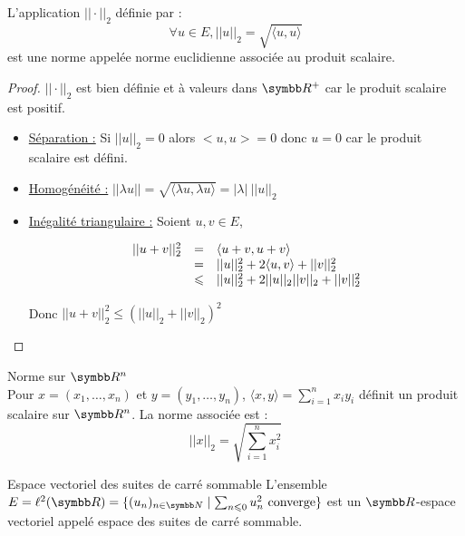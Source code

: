 \begin{theoreme}{}{}
    L'application $|| \cdot ||_2$ définie par : 
    \[\forall u \in E, ||u||_2 = \sqrt{\langle u, u \rangle}\]
    est une norme appelée norme euclidienne associée au produit scalaire. 
\end{theoreme}


\begin{proof}
    $|| \cdot ||_2$ est bien définie et à valeurs dans $\R^+$ car le produit scalaire est positif. 

    \begin{itemize}
        \item \uline{Séparation :} Si $||u||_2 = 0 $ alors $<u, u> = 0$ donc $u = 0$ car le produit scalaire est défini. 

        \item \uline{Homogénéité :} $||\lambda u|| = \sqrt{\langle \lambda u, \lambda u\rangle} = |\lambda| ~ ||u||_2$

        \item \uline{Inégalité triangulaire :} Soient $u, v \in E$,

        \[
            \begin{array}{rcl}
                ||u + v ||^2_2 & = & \langle u + v , u + v \rangle \\
                \space & = & ||u||_2^2 + 2 \langle u, v \rangle + ||v||_2^2 \\
                \space & \leqslant & ||u||_2^2 + 2 ||u||_2||v||_2 + ||v||_2^2 \\
            \end{array}
        \]

        Donc $||u + v||_2^2 \leqslant (||u||_2 + ||v||_2)^2$
    \end{itemize}
\end{proof}

\begin{definition}{Norme sur $\R^n$}{}
    \\Pour $x = (x_1, \dots, x_n)$ et $y = (y_1, \dots, y_n)$, $\displaystyle \langle x, y \rangle = \sum_{i = 1 }^{n }x_i y_i$ définit un 
    produit scalaire sur $\R^n$. La norme associée est :
    \[||x||_2 = \sqrt{\sum_{i = 1 }^{n }x_i^2}\]
\end{definition}

\begin{theoreme}{Espace vectoriel des suites de carré sommable}{}
    L'ensemble $E = \ell^2(\R) = \{(u_n)_{n \in \N} \mid \sum_{n \leqslant 0 }u_n^2 \text{ converge}\}$
    est un $\R$-espace vectoriel appelé espace des suites de carré sommable. 
\end{theoreme}

